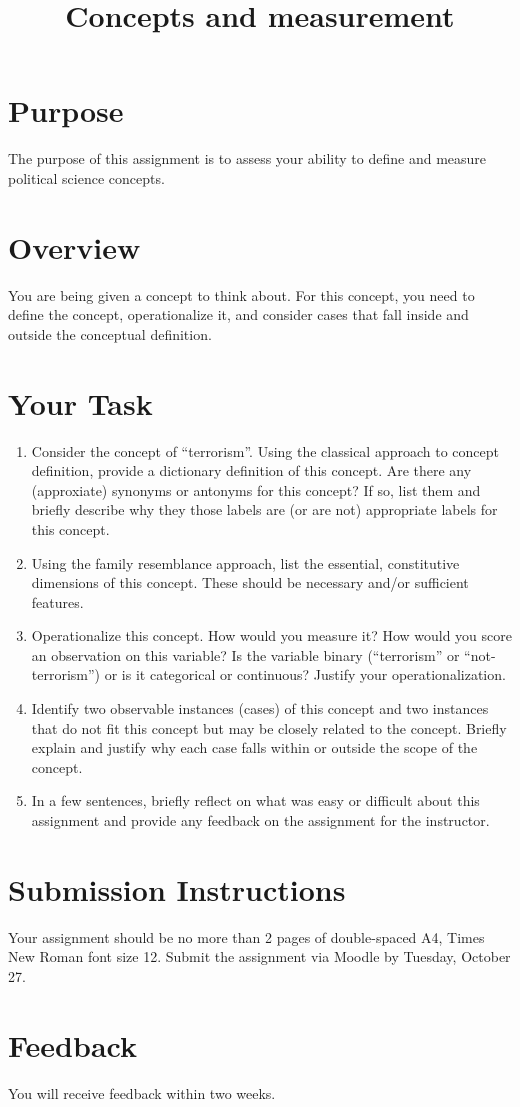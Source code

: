 \documentclass[a4, 12pt]{article}
\title{Concepts and measurement}
\author{}
\date{}
\begin{document}
\maketitle
\vspace{-6em}

\section{Purpose}
The purpose of this assignment is to assess your ability to define and measure political science concepts.

\section{Overview}

You are being given a concept to think about. For this concept, you need to define the concept, operationalize it, and consider cases that fall inside and outside the conceptual definition.

\section{Your Task}

\begin{enumerate}\itemsep1em
\item Consider the concept of ``terrorism''. Using the classical approach to concept definition, provide a dictionary definition of this concept. Are there any (approxiate) synonyms or antonyms for this concept? If so, list them and briefly describe why they those labels are (or are not) appropriate labels for this concept.

\item Using the family resemblance approach, list the essential, constitutive dimensions of this concept. These should be necessary and/or sufficient features.

\item Operationalize this concept. How would you measure it? How would you score an observation on this variable? Is the variable binary (``terrorism'' or ``not-terrorism'') or is it categorical or continuous? Justify your operationalization.

\item Identify two observable instances (cases) of this concept and two instances that do not fit this concept but may be closely related to the concept. Briefly explain and justify why each case falls within or outside the scope of the concept.

\item In a few sentences, briefly reflect on what was easy or difficult about this assignment and provide any feedback on the assignment for the instructor.

\end{enumerate}

\section{Submission Instructions}

Your assignment should be no more than 2 pages of double-spaced A4, Times New Roman font size 12. Submit the assignment via Moodle by Tuesday, October 27.

\section{Feedback}

You will receive feedback within two weeks.
\end{document}
